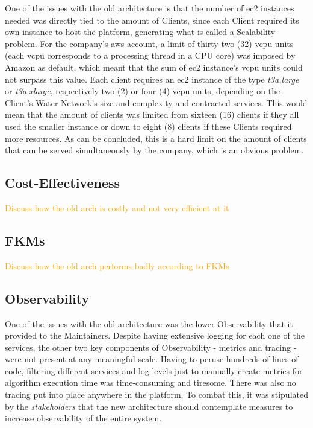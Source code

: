 
One of the issues with the old architecture is that the number of \gls{ec2} instances needed was directly tied to the amount of Clients, since each Client required its own instance to host the platform, generating what is called a Scalability problem. For the company's \gls{aws} account, a limit of thirty-two (32) \gls{vcpu} units (each \gls{vcpu} corresponds to a processing thread in a CPU core) was imposed by Amazon as default, which meant that the sum of \gls{ec2} instance's \gls{vcpu} units could not surpass this value. Each client requires an \gls{ec2} instance of the type \textit{t3a.large} or \textit{t3a.xlarge}, respectively two (2) or four (4) \gls{vcpu} units, depending on the Client's Water Network's size and complexity and contracted services. This would mean that the amount of clients was limited from sixteen (16) clients if they all used the smaller instance or down to eight (8) clients if these Clients required more resources. As can be concluded, this is a hard limit on the amount of clients that can be served simultaneously by the company, which is an obvious problem.


\subsection{Cost-Effectiveness}\label{methodology:sss:cost-effectiveness}
\textcolor{orange}{ Discuss how the old arch is costly and not very efficient at it}

\subsection{FKMs}\label{methodology:sss:fkms}
\textcolor{orange}{ Discuss how the old arch performs badly according to FKMs}

\subsection{Observability}\label{methodology:ss:observability}

One of the issues with the old architecture was the lower Observability that it provided to the Maintainers. Despite having extensive logging for each one of the services, the other two key components of Observability - metrics and tracing - were not present at any meaningful scale. Having to peruse hundreds of lines of code, filtering different services and log levels just to manually create metrics for algorithm execution time was time-consuming and tiresome. There was also no tracing put into place anywhere in the platform. To combat this, it was stipulated by the \textit{stakeholders} that the new architecture should contemplate measures to increase observability of the entire system.

